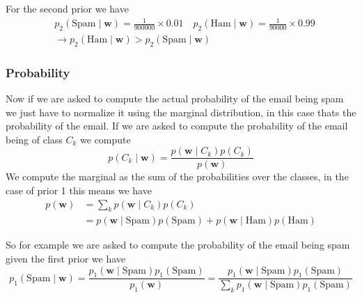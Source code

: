 \documentclass[12pt]{article}
\begin{document}
For the second prior we have
\begin{align*}
    &p_2(\text{Spam}\mid \mathbf w) = \frac{1}{900000}\times 0.01 \quad p_2(\text{Ham}\mid \mathbf w) =\frac{1}{90000}\times 0.99 \\
    &\rightarrow p_2(\text{Ham} \mid \mathbf w) > p_2(\text{Spam}\mid \mathbf w)    
\end{align*}

\subsubsection*{Probability}
Now if we are asked to compute the actual probability of the email being spam we just have to normalize it using the marginal distribution, in this case thats the probability of the email. If we are asked to compute the probability of the email being of class $C_k$ we compute 
\[
    p(C_k\mid \mathbf w) = \frac{p(\mathbf w\mid C_k)p(C_k)}{p(\mathbf w)}  
\]
We compute the marginal as the sum of the probabilities over the classes, in the case of prior 1 this means we have 
\begin{align*}
    p(\mathbf w) &= \sum_k p(\mathbf w\mid C_k)p(C_k) \\
    & = p(\mathbf w\mid \text{Spam})p(\text{Spam}) + p(\mathbf w\mid \text{Ham})p(\text{Ham})    
\end{align*}

So for example we are asked to compute the probability of the email being spam given the first prior we have
\[
    p_1(\text{Spam}\mid \mathbf w) = \frac{p_1(\mathbf w\mid \text{Spam})p_1(\text{Spam})}{p_1(\mathbf w)} = \frac{p_1(\mathbf w\mid \text{Spam})p_1(\text{Spam})}{\sum_k p_1(\mathbf w\mid \text{Spam})p_1(\text{Spam})}    
\]
\end{document}
